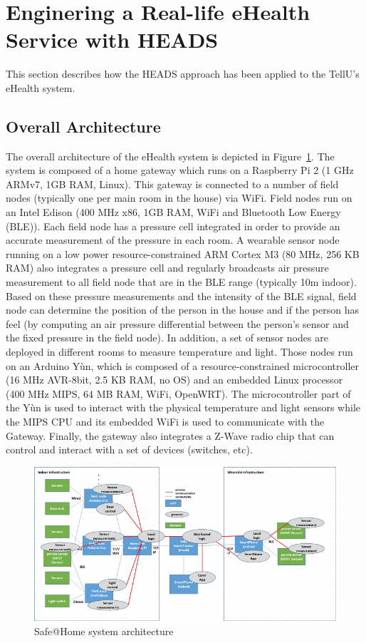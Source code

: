 \section{Enginering a Real-life eHealth Service with HEADS}

This section describes how the HEADS approach has been applied to the TellU's eHealth system. 

\subsection{Overall Architecture}
The overall architecture of the eHealth system is depicted in Figure~\ref{fig:fig3}. The system is composed of a home gateway which runs on a Raspberry Pi 2 (1 GHz ARMv7, 1GB RAM, Linux). This gateway is connected to a number of field nodes (typically one per main room in the house) via WiFi. Field nodes run on an Intel Edison (400 MHz x86, 1GB RAM, WiFi and Bluetooth Low Energy (BLE)). Each field node has a pressure cell integrated in order to provide an accurate measurement of the pressure in each room. A wearable sensor node running on a low power resource-constrained ARM Cortex M3 (80 MHz, 256 KB RAM) also integrates a pressure cell and regularly broadcasts air pressure measurement to all field node that are in the BLE range (typically 10m indoor). Based on these pressure measurements and the intensity of the BLE signal, field node can determine the position of the person in the house and if the person has feel (by computing an air pressure differential between the person's sensor and the fixed pressure in the field node). In addition, a set of sensor nodes are deployed in different rooms to measure temperature and light. Those nodes run on an Arduino Yùn, which is composed of a resource-constrained microcontroller (16 MHz AVR-8bit, 2.5 KB RAM, no OS) and an embedded Linux processor (400 MHz MIPS, 64 MB RAM, WiFi, OpenWRT). The microcontroller part of the Yùn is used to interact with the physical temperature and light sensors while the MIPS CPU and its embedded WiFi is used to communicate with the Gateway. Finally, the gateway also integrates a Z-Wave radio chip that can control and interact with a set of devices (switches, etc). 

\begin{figure}[!t]
	\centering
	\includegraphics[width=0.7\linewidth]{figures/fig3}
	\caption{Safe@Home system architecture}
	\label{fig:fig3}
\end{figure}



